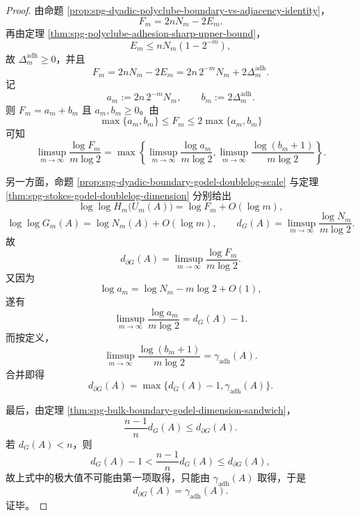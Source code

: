 \begin{proof}
由命题 \ref{prop:spg-dyadic-polyclube-boundary-vs-adjacency-identity}，
\[
F_m=2nN_m-2E_m.
\]
再由定理 \ref{thm:spg-polyclube-adhesion-sharp-upper-bound}，
\[
E_m\le nN_m(1-2^{-m}),
\]
故 \(\Delta_m^{\mathrm{adh}}\ge 0\)，并且
\[
F_m
=
2nN_m-2E_m
=
2n\,2^{-m}N_m+2\Delta_m^{\mathrm{adh}}.
\]
记
\[
a_m:=2n\,2^{-m}N_m,
\qquad
b_m:=2\Delta_m^{\mathrm{adh}}.
\]
则 \(F_m=a_m+b_m\) 且 \(a_m,b_m\ge 0\)。由
\[
\max\{a_m,b_m\}\le F_m\le 2\max\{a_m,b_m\}
\]
可知
\[
\limsup_{m\to\infty}\frac{\log F_m}{m\log 2}
=
\max\left\{
\limsup_{m\to\infty}\frac{\log a_m}{m\log 2},
\limsup_{m\to\infty}\frac{\log(b_m+1)}{m\log 2}
\right\}.
\]

另一方面，命题 \ref{prop:spg-dyadic-boundary-godel-doublelog-scale} 与定理 \ref{thm:spg-stokes-godel-doublelog-dimension} 分别给出
\[
\log\log H_m\!\bigl(U_m(A)\bigr)=\log F_m+O(\log m),
\]
\[
\log\log G_m(A)=\log N_m(A)+O(\log m),
\qquad
d_G(A)=\limsup_{m\to\infty}\frac{\log N_m}{m\log 2}.
\]
故
\[
d_{\partial G}(A)=\limsup_{m\to\infty}\frac{\log F_m}{m\log 2}.
\]
又因为
\[
\log a_m=\log N_m-m\log 2+O(1),
\]
遂有
\[
\limsup_{m\to\infty}\frac{\log a_m}{m\log 2}=d_G(A)-1.
\]
而按定义，
\[
\limsup_{m\to\infty}\frac{\log(b_m+1)}{m\log 2}
=
\gamma_{\mathrm{adh}}(A).
\]
合并即得
\[
d_{\partial G}(A)=\max\bigl\{d_G(A)-1,\gamma_{\mathrm{adh}}(A)\bigr\}.
\]

最后，由定理 \ref{thm:spg-bulk-boundary-godel-dimension-sandwich}，
\[
\frac{n-1}{n}d_G(A)\le d_{\partial G}(A).
\]
若 \(d_G(A)<n\)，则
\[
d_G(A)-1<\frac{n-1}{n}d_G(A)\le d_{\partial G}(A),
\]
故上式中的极大值不可能由第一项取得，只能由 \(\gamma_{\mathrm{adh}}(A)\) 取得，于是
\[
d_{\partial G}(A)=\gamma_{\mathrm{adh}}(A).
\]
证毕。
\end{proof}

